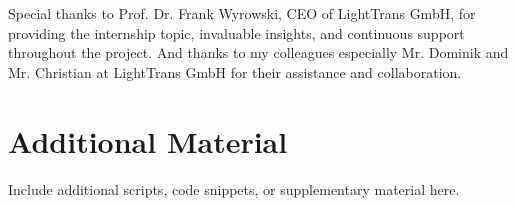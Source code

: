 \documentclass[a4paper,12pt]{report}
\begin{document}
Special thanks to Prof. Dr. Frank Wyrowski, CEO of LightTrans GmbH, for providing the internship topic, invaluable insights, and continuous support throughout the project. And thanks to my colleagues especially  Mr. Dominik and Mr. Christian at LightTrans GmbH for their assistance and collaboration.






\appendix
\chapter{Additional Material}
Include additional scripts, code snippets, or supplementary material here.
\end{document}
